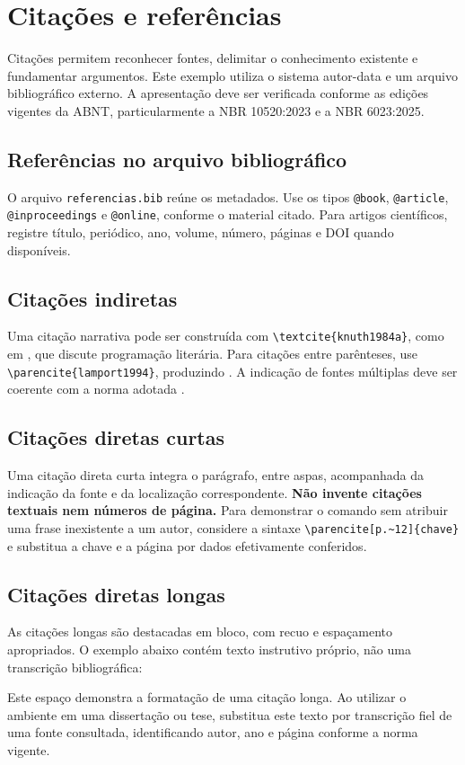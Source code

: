 \chapter{Citações e referências}\label{chap:citacoes}
Citações permitem reconhecer fontes, delimitar o conhecimento existente e fundamentar argumentos. Este exemplo utiliza o sistema autor-data e um arquivo bibliográfico externo. A apresentação deve ser verificada conforme as edições vigentes da ABNT, particularmente a NBR 10520:2023 e a NBR 6023:2025.

\section{Referências no arquivo bibliográfico}
O arquivo \texttt{referencias.bib} reúne os metadados. Use os tipos \texttt{@book}, \texttt{@article}, \texttt{@inproceedings} e \texttt{@online}, conforme o material citado. Para artigos científicos, registre título, periódico, ano, volume, número, páginas e DOI quando disponíveis.

\section{Citações indiretas}
Uma citação narrativa pode ser construída com \verb|\textcite{knuth1984a}|, como em \textcite{knuth1984a}, que discute programação literária. Para citações entre parênteses, use \verb|\parencite{lamport1994}|, produzindo \parencite{lamport1994}. A indicação de fontes múltiplas deve ser coerente com a norma adotada \parencite{knuth1984a,lamport1994}.

\section{Citações diretas curtas}
Uma citação direta curta integra o parágrafo, entre aspas, acompanhada da indicação da fonte e da localização correspondente. \textbf{Não invente citações textuais nem números de página.} Para demonstrar o comando sem atribuir uma frase inexistente a um autor, considere a sintaxe \verb|\parencite[p.~12]{chave}| e substitua a chave e a página por dados efetivamente conferidos.

\section{Citações diretas longas}
As citações longas são destacadas em bloco, com recuo e espaçamento apropriados. O exemplo abaixo contém texto instrutivo próprio, não uma transcrição bibliográfica:
\begin{citacao}
Este espaço demonstra a formatação de uma citação longa. Ao utilizar o ambiente em uma dissertação ou tese, substitua este texto por transcrição fiel de uma fonte consultada, identificando autor, ano e página conforme a norma vigente.
\end{citacao}


